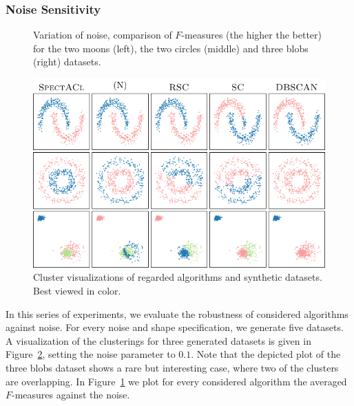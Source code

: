 \subsubsection{Noise Sensitivity}
\begin{figure}[t]
\centering

\caption{Variation of noise, comparison of $F$-measures (the higher the better) for the two moons (left), the two circles (middle) and three blobs (right) datasets.}
\label{fig:noisePlot}
\end{figure}
\begin{figure}[t]
\centering
\includegraphics[width=\linewidth]{pics/SASynthScatter.pdf}
%
\caption{Cluster visualizations of regarded algorithms and synthetic datasets. Best viewed in color.}
\label{fig:synthViz}
\end{figure}
In this series of experiments, we evaluate the robustness of considered algorithms against noise. For every noise and shape specification, we generate five datasets. A visualization of the clusterings for three generated datasets is given in Figure~\ref{fig:synthViz}, setting the noise parameter to $0.1$. Note that the depicted plot of the three blobs dataset shows a rare but interesting case, where two of the clusters are overlapping. In Figure~\ref{fig:noisePlot} we plot for every considered algorithm the averaged $F$-measures against the noise.  

